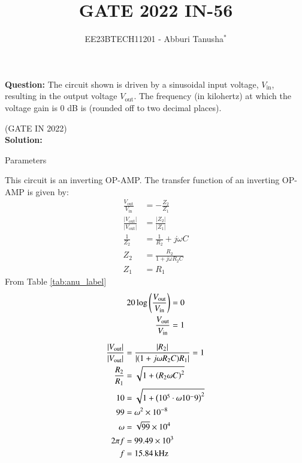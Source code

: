 \documentclass[journal,12pt,twocolumn]{IEEEtran}
\theoremstyle{remark}
\begin{document}

\vspace{3cm}

\title{GATE 2022 IN-56}
\author{EE23BTECH11201 - Abburi Tanusha$^{*}$%
}
\maketitle
\newpage
\bigskip

\renewcommand{\thefigure}{\theenumi}
\renewcommand{\thetable}{\theenumi}

\vspace{3cm}

\maketitle
\textbf{Question:} 
The circuit shown is driven by a sinusoidal input voltage, $V_{\text{in}}$, resulting in the output voltage $V_{\text{out}}$. The frequency (in kilohertz) at which the voltage gain is 0 dB is (rounded off to two decimal places).
\begin{figure}[htb]
	\centering
	
	\label{fig:1}
\end{figure}
\hfill(GATE IN 2022)\\
\textbf{Solution:} 
\begin{table}[h]
 	\centering
 	\resizebox{12 cm}{!}{
 		
 	}
 	\vspace{6 pt}
 	\caption{Parameters}
 	\label{tab:anu_label} 
 \end{table}
This circuit is an inverting OP-AMP. The transfer function of an inverting OP-AMP is given by:
\begin{align}
\frac{V_{\text{out}}}{V_{\text{in}}} &= -\frac{Z_2}{Z_1} \\
\frac{|V_{\text{out}}|}{|V_{\text{out}}|} &= \frac{|Z_2|}{|Z_1|} \\
\frac{1}{Z_2} &= \frac{1}{R_2} + j\omega C \\
Z_2 &= \frac{R_2}{1+j \omega R_2C} \\
Z_1 &= R_1
\end{align}
From Table \ref{tab:anu_label}
\begin{align}
20 \log \left(\frac{V_{\text{out}}}{V_{\text{in}}}\right) &= 0 \\
\frac{V_{\text{out}}}{V_{\text{in}}} &= 1
\end{align}

\begin{align}
\frac{|V_{\text{out}}|}{|V_{\text{out}}|} &= \frac{|R_2|}{|(1+ j\omega R_2C)R_1|} = 1 \\
\frac{R_2}{R_1} &= \sqrt{1 + \left(R_2 \omega C\right)^2} \\
10 &= \sqrt{1 + \left(10^5 \cdot \omega 10^-9\right)^2} \\
99 &= \omega^2 \times 10^{-8} \\
\omega &= \sqrt{99} \times 10^4 \\
2\pi f &= 99.49 \times 10^3 \\
f &= 15.84 \, \text{kHz}
\end{align}
\end{document}

